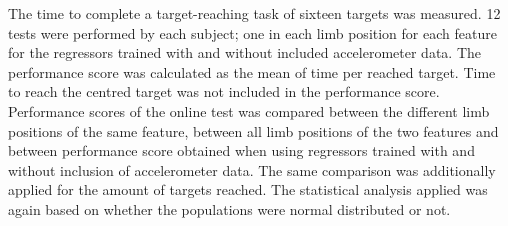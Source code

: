  The time to complete a target-reaching task of sixteen targets was measured. 12 tests were performed by each subject; one in each limb position for each feature for the regressors trained with and without included accelerometer data. The performance score was calculated as the mean of time per reached target. Time to reach the centred target was not included in the performance score. Performance scores of the online test was compared between the different limb positions of the same feature, between all limb positions of the two features and between performance score obtained when using regressors trained with and without inclusion of accelerometer data. The same comparison was additionally applied for the amount of targets reached. The statistical analysis applied was again based on whether the populations were normal distributed or not.
 
